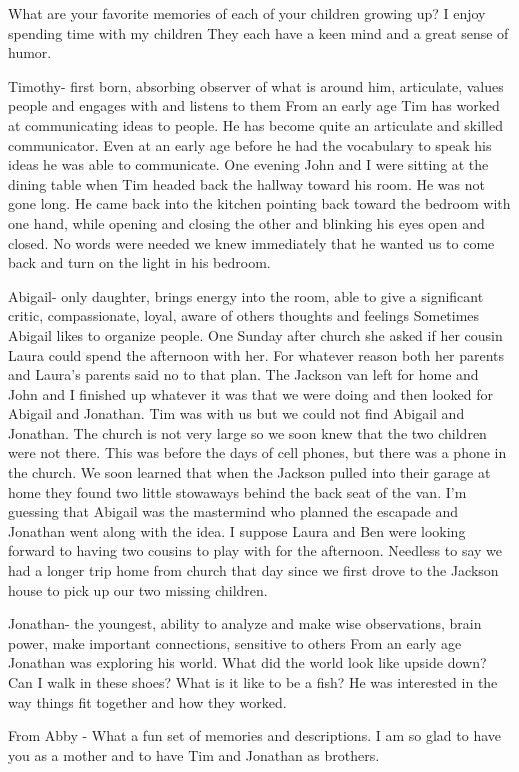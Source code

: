 What are your favorite memories of each of your children growing up?
I enjoy spending time with my children They each have a keen mind and a great sense of humor.

Timothy- first born, absorbing observer of what is around him, articulate, values people and engages with and listens to them
From an early age Tim has worked at communicating ideas to people.
He has become quite an articulate and skilled communicator.
Even at an early age before he had the vocabulary to speak his ideas he was able to communicate.
One evening John and I were sitting at the dining table when Tim headed back the hallway toward his room.
He was not gone long.
He came back into the kitchen pointing back toward the bedroom with one hand, while opening and closing the other and blinking his eyes open and closed.
No words were needed we knew immediately that he wanted us to come back and turn on the light in his bedroom.

Abigail- only daughter, brings energy into the room, able to give a significant critic, compassionate, loyal, aware of others thoughts and feelings
Sometimes Abigail likes to organize people.
One Sunday after church she asked if her cousin Laura could spend the afternoon with her.
For whatever reason both her parents and Laura's parents said no to that plan.
The Jackson van left for home and John and I finished up whatever it was that we were doing and then looked for Abigail and Jonathan.
Tim was with us but we could not find Abigail and Jonathan.
The church is not very large so we soon knew that the two children were not there.
This was before the days of cell phones, but there was a phone in the church.
We soon learned that when the Jackson pulled into their garage at home they found two little stowaways behind the back seat of the van.
I'm guessing that Abigail was the mastermind who planned the escapade and Jonathan went along with the idea.
I suppose Laura and Ben were looking forward to having two cousins to play with for the afternoon.
Needless to say we had a longer trip home from church that day since we first drove to the Jackson house to pick up our two missing children.

Jonathan- the youngest, ability to analyze and make wise observations, brain power, make important connections, sensitive to others
From an early age Jonathan was exploring his world.
What did the world look like upside down? Can I walk in these shoes? What is it like to be a fish? He was interested in the way things fit together and how they worked.

From Abby - What a fun set of memories and descriptions.
I am so glad to have you as a mother and to have Tim and Jonathan as brothers.





